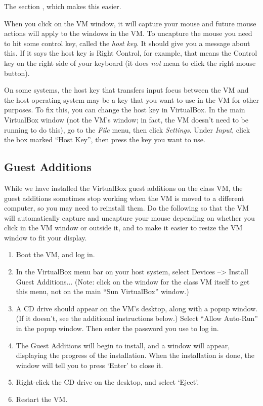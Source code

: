 \documentclass[letterpaper,10pt,english]{sphinxmanual}
\begin{document}
The section {\hyperref[vm:vm\string-additions]{}}, which makes this easier.



When you click on the VM window, it will capture your mouse and future mouse
actions will apply to the windows in the VM.  To uncapture the mouse you
need to hit some control key, called the \emph{host key}.  It should give you a
message about this.  If it says the host key is Right Control, for example,
that means the Control key on the right side of your keyboard (it does \emph{not}
mean to click the right mouse button).

On some systems, the host key that transfers input focus between the
VM and the host operating system may be a key that you want to use in
the VM for other purposes.  To fix this, you can
change the host key in VirtualBox.  In the main VirtualBox window (not
the VM's window; in fact, the VM doesn't need to be running to do
this), go to the \emph{File} menu, then click \emph{Settings}.  Under \emph{Input},
click the box marked ``Host Key'', then press the key you want to use.


\subsection{Guest Additions}
\label{vm:guest-additions}\label{vm:vm-additions}
While we have installed the VirtualBox guest additions on the class
VM, the guest additions sometimes stop working when the VM is moved to
a different computer, so you may need to reinstall them.
Do the following so that the VM will automatically capture and uncapture
your mouse depending on whether you click in the VM window or outside it,
and to make it easier to resize the VM window to fit your display.
\begin{enumerate}
\item {} 
Boot the VM, and log in.

\item {} 
In the VirtualBox menu bar on your host system, select Devices --\textgreater{}
Install Guest Additions...  (Note: click on the window for the class
VM itself to get this menu, not on the main ``Sun VirtualBox'' window.)

\item {} 
A CD drive should appear on the VM's desktop, along with a popup
window.  (If it doesn't, see the additional instructions below.)
Select ``Allow Auto-Run'' in the popup window.  Then enter the
password you use to log in.

\item {} 
The Guest Additions will begin to install, and a window will appear,
displaying the progress of the installation.  When the installation is done,
the window will tell you to press `Enter' to close it.

\item {} 
Right-click the CD drive on the desktop, and select `Eject'.

\item {} 
Restart the VM.

\end{enumerate}
\end{document}
